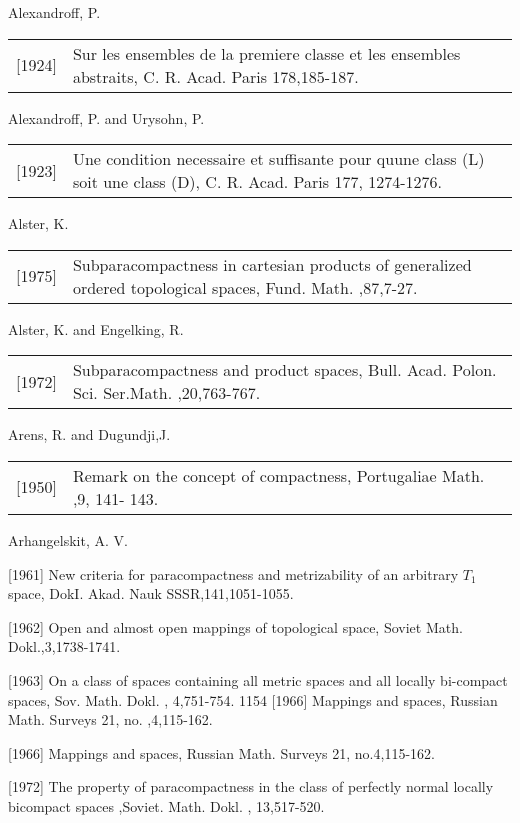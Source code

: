 \documentclass[main.tex]{subfiles}
\begin{document}
\noindent Alexandroff, P.

\begin{tabular}{l p{145mm}}
[1924]  & Sur les ensembles de la premiere classe et les ensembles abstraits, C. R. Acad. Paris 178,185-187. \\
\end{tabular}

\vspace{1mm}
\noindent Alexandroff, P. and Urysohn, P.

\begin{tabular}{l p{145mm}}
[1923] & Une condition necessaire et suffisante pour quune class (L) soit une class (D), C. R. Acad. Paris 177, 1274-1276.
\end{tabular}

\noindent Alster, K.

\begin{tabular}{l p{145mm}}
	[1975] & Subparacompactness in cartesian products of generalized ordered topological spaces, Fund. Math. ,87,7-27.
\end{tabular}

\vspace{1mm}
\noindent Alster, K. and Engelking, R.

\begin{tabular}{l p{145mm}}
[1972] & Subparacompactness and product spaces, Bull. Acad. Polon. Sci. Ser.Math. ,20,763-767.
\end{tabular}

\noindent Arens, R. and Dugundji,J.

\begin{tabular}{l p{145mm}}
	[1950] & Remark on the concept of compactness, Portugaliae Math. ,9, 141- 143.
\end{tabular}

\noindent Arhangelskit, A. V.

[1961] New criteria for paracompactness and metrizability of an arbitrary $T_1$ space, DokI. Akad. Nauk SSSR,141,1051-1055.

[1962] Open and almost open mappings of topological space, Soviet Math. Dokl.,3,1738-1741.

[1963] On a class of spaces containing all metric spaces and all locally bi-compact spaces, Sov. Math. Dokl. , 4,751-754. 1154
[1966] Mappings and spaces, Russian Math. Surveys 21, no. ,4,115-162.

[1966] Mappings and spaces, Russian Math. Surveys 21, no.4,115-162.
	
[1972] The property of paracompactness in the class of perfectly normal locally bicompact spaces ,Soviet. Math. Dokl. , 13,517-520.
\end{document}
